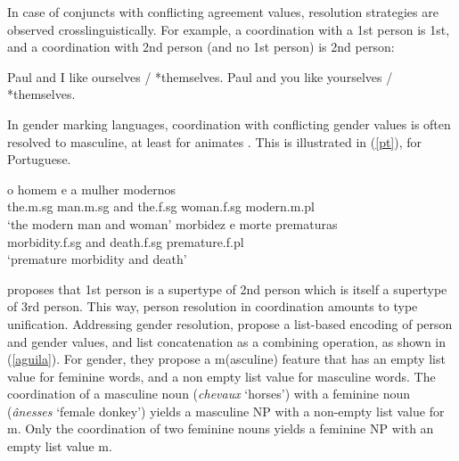\documentclass[output=paper
                ,modfonts
                ,nonflat
	        ,collection
	        ,collectionchapter
	        ,collectiontoclongg
 	        ,biblatex
                ,babelshorthands
                ,newtxmath
                ,draftmode
                ,colorlinks, citecolor=brown
]{./langsci/langscibook}
\begin{document}
In case of conjuncts with conflicting agreement values, resolution strategies are observed 
crosslinguistically. For example, a coordination with a 1st person is 1st, and a coordination with 2nd person (and no 1st person) is 2nd person:

\begin{exe}
 \ex
\begin{xlista}
\ex Paul and I like ourselves / *themselves.
\ex Paul and you like yourselves / *themselves.
\end{xlista}
\end{exe}

In gender marking languages, coordination with conflicting gender values is often resolved to 
masculine, at least for animates \citep{Corbet91}. This is illustrated in (\ref{pt}), for Portuguese.

\begin{exe}
 \ex
\begin{xlista}
\ex \gll o homem e a mulher modernos \\
the.{\sc m.sg} man.{\sc m.sg} and the.{\sc f.sg} woman.{\sc f.sg} modern.{\sc m.pl} \\
\glt `the modern man and woman'
\ex \gll morbidez e morte prematuras \\
morbidity.{\sc f.sg} and death.{\sc f.sg} premature.{\sc f.pl}\\
\glt `premature morbidity and death'\\
\citep[433]{Villavicencio:Sadler:ea:05}
\end{xlista}\label{pt}
\end{exe}




 \citet{Sag:03} proposes that 1st person is a supertype of 2nd person which is itself a supertype of 3rd person. This way, person resolution in coordination amounts to type unification. Addressing gender resolution, \citet{Aguila:Crysmann:18} propose a list-based encoding of person and gender values, and list concatenation as a combining operation, as shown in (\ref{aguila}). For gender, they propose a {\sc m}({\sc asculine}) feature that has an empty list value for feminine words, and a non empty list value for masculine words.  The coordination of a masculine noun ({\it chevaux} `horses') with a feminine noun ({\it \^{a}nesses} `female donkey')  yields a masculine NP with a non-empty list value for {\sc m}. Only the coordination of two feminine nouns yields a feminine NP with an empty list value {\sc m}.
 
\end{document}

